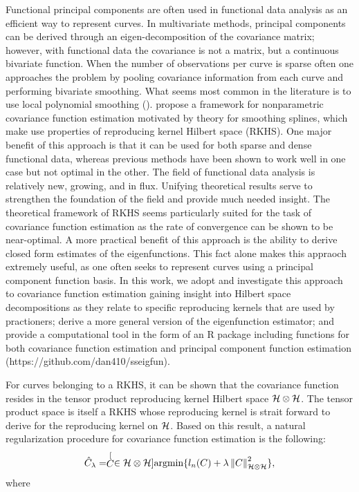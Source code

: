 Functional principal components are often used in functional data analysis as an efficient way to represent curves. In multivariate methods, principal components can be derived through an eigen-decomposition of the covariance matrix; however, with functional data the covariance is not a matrix, but a continuous bivariate function. When the number of observations per curve is sparse often one approaches the problem by pooling covariance information from each curve and performing bivariate smoothing. What seems most common in the literature is to use local polynomial smoothing (\cite{Yao:2005cv}). \cite{Cai:2010vr} propose a framework for nonparametric covariance function estimation motivated by theory for smoothing splines, which make use properties of reproducing kernel Hilbert space (RKHS). One major benefit of this approach is that it can be used for both sparse and dense functional data, whereas previous methods have been shown to work well in one case but not optimal in the other. The field of functional data analysis is relatively new, growing, and in flux. Unifying theoretical results serve to strengthen the foundation of the field and provide much needed insight. The theoretical framework of RKHS seems particularly suited for the task of covariance function estimation as the rate of convergence can be shown to be near-optimal. A more practical benefit of this approach is the ability to derive closed form estimates of the eigenfunctions. This fact alone makes this appraoch extremely useful, as one often seeks to represent curves using a principal component function basis. In this work, we adopt and investigate this approach to covariance function estimation gaining insight into Hilbert space decompositions as they relate to specific reproducing kernels that are used by practioners; derive a more general version of the eigenfunction estimator; and provide a computational tool in the form of an R package including functions for both covariance function estimation and principal component function estimation (https://github.com/dan410/sseigfun).

For curves belonging to a RKHS, it can be shown that the covariance function resides in the tensor product reproducing kernel Hilbert space $\mathcal{H}\otimes \mathcal{H}$. The tensor product space is itself a RKHS whose reproducing kernel is strait forward to derive for the reproducing kernel on $\mathcal{H}$. Based on this result, a natural regularization procedure for covariance function estimation is the following: 
\begin{equation}
	\label{eq:cy-cov-est} \hat{C}_{\lambda} = \stackrel[C \in \mathcal{H}\otimes\mathcal{H}]{}{\mbox{argmin}} \{l_{n}(C)+\lambda\left\Vert C\right\Vert _{\mathcal{H}\otimes \mathcal{H}}^{2}\}, 
\end{equation}
where

